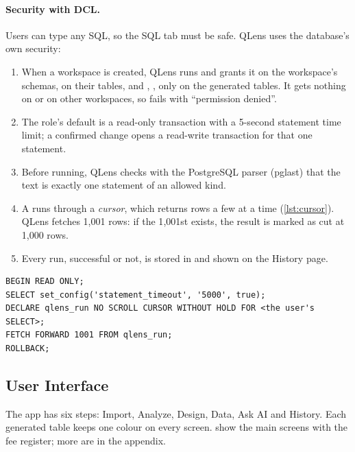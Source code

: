 \paragraph{Security with DCL.} Users can type any SQL, so the SQL tab must be safe. QLens uses the
database's own security:
\begin{enumerate}
  \item When a workspace is created, QLens runs  and grants
  it  on the workspace's schemas,  on their tables, and ,
  ,  only on the generated tables. It gets nothing on  or on other
  workspaces, so  fails with ``permission denied''.
  \item The role's default is a read-only transaction with a 5-second statement time limit; a confirmed
  change opens a read-write transaction for that one statement.
  \item Before running, QLens checks with the PostgreSQL parser (pglast) that the text is exactly one
  statement of an allowed kind.
  \item A  runs through a \emph{cursor}, which returns rows a few at a time (\cref{lst:cursor}).
  QLens fetches 1{,}001 rows: if the 1{,}001st exists, the result is marked as cut at 1{,}000 rows.
  \item Every run, successful or not, is stored in  and shown on the History page.
\end{enumerate}

\begin{lstlisting}[float=tbp,caption={[Cursor in the SQL tab]Statements the SQL tab runs for a SELECT, as the workspace's restricted user},label={lst:cursor}]
BEGIN READ ONLY;
SELECT set_config('statement_timeout', '5000', true);
DECLARE qlens_run NO SCROLL CURSOR WITHOUT HOLD FOR <the user's SELECT>;
FETCH FORWARD 1001 FROM qlens_run;
ROLLBACK;
\end{lstlisting}

\subsection{User Interface}
\label{sec:design-ui}

The app has six steps: Import, Analyze, Design, Data, Ask AI and History. Each generated table keeps one colour
on every screen.  show the
main screens with the fee register; more are in the appendix.

